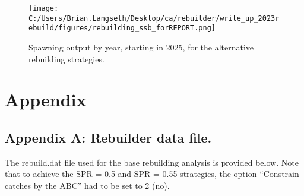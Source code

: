 \documentclass[11pt,
  letterpaper,
]{article}
\begin{document}
\begin{figure}
\centering
\texttt{[image: C:/Users/Brian.Langseth/Desktop/ca/rebuilder/write\_up\_2023rebuild/figures/rebuilding\_ssb\_forREPORT.png]}
\caption{Spawning output by year, starting in 2025, for the alternative rebuilding strategies.\label{fig:ssb-fig}}
\end{figure}

\clearpage

\clearpage

\hypertarget{appendix}{%
\section{Appendix}\label{appendix}}

\hypertarget{append_a}{%
\subsection{Appendix A: Rebuilder data file.}\label{append_a}}

The rebuild.dat file used for the base rebuilding analysis is provided below. Note that to achieve the SPR = 0.5 and SPR = 0.55 strategies, the option ``Constrain catches by the ABC'' had to be set to 2 (no).

\clearpage
\end{document}
